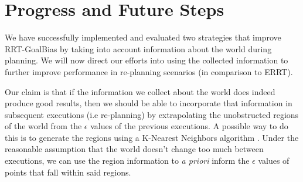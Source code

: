 \documentclass[10pt,twoside,twocolumn]{article}
\begin{document}
\section{Progress and Future Steps}

We have successfully implemented and evaluated two strategies that improve RRT-GoalBias by
taking into account information about the world during planning. We will now
direct our efforts into using the collected information to further improve performance
in re-planning scenarios (in comparison to ERRT). 

Our claim is that if the information we collect
about the world does indeed produce good results, then we should be able to incorporate that
information in subsequent executions (i.e re-planning) by extrapolating the unobstructed regions of
the world from the $\epsilon$ values of the previous executions. A possible way to do this is
to generate the regions using a K-Nearest Neighbors algorithm \cite{citeulike:995135}. Under the reasonable assumption
that the world doesn't change too much between executions, we can use the region information to
\emph{a priori} inform the $\epsilon$ values of points that fall
within said regions.


{}


\appendix 
\end{document}
